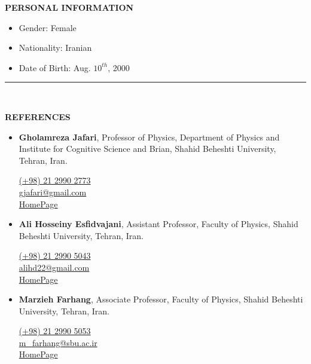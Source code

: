 \documentclass[11pt, b4paper]{cv}
\begin{document}
\textbf{PERSONAL INFORMATION}
\vspace{-0.1in}

\begin{multicols}{3}[\columnsep=0cm]
	\begin{itemize}
	  \item Gender: Female
	  \item Nationality: Iranian
	  \item Date of Birth: Aug. $10^{th}$, 2000
	\end{itemize}
\end{multicols}

\vspace{-0.15in}
\rule{\textwidth}{1pt}\\
\vspace{-0.15in}

\textbf{REFERENCES}
\vspace{-0.1in}

\begin{itemize}
	\item \textbf{Gholamreza Jafari}, Professor of Physics, Department of Physics and Institute for Cognitive Science and Brian, Shahid Beheshti University, Tehran, Iran.
	
	\href{tel:(+98)2129902773}{ (+98) 21 2990 2773}\\
	\href{mailto:gjafari@gmail.com}{ gjafari@gmail.com}\\
	\href{https://complexity.sbu.ac.ir/professor-reza-jafari/}{HomePage} 
	\item \textbf{Ali Hosseiny Esfidvajani}, Assistant Professor, Faculty of Physics, Shahid Beheshti University, Tehran, Iran.
	
	\href{tel:(+98)2129905043}{ (+98) 21 2990 5043}\\
	\href{mailto:alihd22@gmail.com}{ alihd22@gmail.com}\\
	\href{https://alihosseiny.com/}{HomePage} 
		
	\item \textbf{Marzieh Farhang}, Associate Professor, Faculty of Physics, Shahid Beheshti University, Tehran, Iran.
	
	\href{tel:(+98)2129905053}{ (+98) 21 2990 5053}\\
	\href{mailto:m\_farhang@sbu.ac.ir}{ m\_farhang@sbu.ac.ir}\\
	\href{https://en.sbu.ac.ir/~m_farhang/home}{HomePage} 
\end{itemize}
\end{document}
